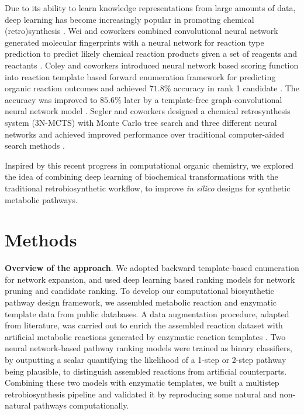 \documentclass{article}
\begin{document}
Due to its ability to learn knowledge representations from large amounts of data, deep learning has become increasingly popular in promoting chemical (retro)synthesis \citep{lecun2015deep, lin2019retrosynthetic}. 
Wei and coworkers combined convolutional neural network generated molecular fingerprints with a neural network for reaction type prediction to predict likely chemical reaction products given a set of reagents and reactants \citep{wei2016neural, ananiadou2010event}. 
Coley and coworkers introduced neural network based scoring function into reaction template based forward enumeration framework for predicting organic reaction outcomes and achieved $71.8\%$ accuracy in rank 1 candidate \citep{coley2017prediction}. The accuracy was improved to $85.6\%$ later by a template-free graph-convolutional neural network model \citep{coley2019graph, jin2017predicting}. 
Segler and coworkers designed a chemical retrosynthesis system (3N-MCTS) with Monte Carlo tree search and three different neural networks and achieved improved performance over traditional computer-aided search methods \citep{segler2018planning}.   


Inspired by this recent progress in computational organic chemistry, we explored the idea of combining deep learning of biochemical transformations with the traditional retrobiosynthetic workflow, to improve \emph{in silico} designs for synthetic metabolic pathways. 


%

\section{Methods} \label{sec:Methods}
\textbf{Overview of the approach}. 
We adopted backward template-based enumeration for network expansion, and used deep learning based ranking models for network pruning and candidate ranking. 
To develop our computational biosynthetic pathway design framework, we assembled metabolic
reaction and enzymatic template data from public databases. A data augmentation procedure,
adapted from literature, was carried out to enrich the assembled reaction dataset with artificial
metabolic reactions generated by enzymatic reaction templates \citep{coley2017computer}. 
Two neural network-based pathway ranking models were trained as binary classifiers, by outputting a scalar quantifying the likelihood of a 1-step or 2-step pathway being plausible, to distinguish assembled reactions from artificial counterparts. Combining these two models with enzymatic templates, we built a
multistep retrobiosynthesis pipeline and validated it by reproducing some natural and non-natural pathways computationally.
\end{document}
